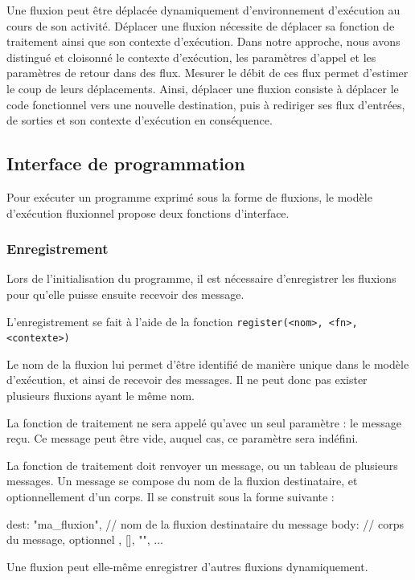 Une fluxion peut être déplacée dynamiquement d'environnement d'exécution au cours de son activité.
Déplacer une fluxion nécessite de déplacer sa fonction de traitement ainsi que son contexte d'exécution.
Dans notre approche, nous avons distingué et cloisonné le contexte d'exécution, les paramètres d'appel et les paramètres de retour dans des flux.
Mesurer le débit de ces flux permet d'estimer le coup de leurs déplacements.
Ainsi, déplacer une fluxion consiste à déplacer le code fonctionnel vers une nouvelle destination, puis à rediriger ses flux d'entrées, de sorties et son contexte d'exécution en conséquence.

\subsection{Interface de programmation}

Pour exécuter un programme exprimé sous la forme de fluxions, le modèle d'exécution fluxionnel propose deux fonctions d'interface.

\subsubsection{Enregistrement}

Lors de l'initialisation du programme, il est nécessaire d'enregistrer les fluxions pour qu'elle puisse ensuite recevoir des message.

L'enregistrement se fait à l'aide de la fonction \texttt{register(<nom>, <fn>, <contexte>)}

Le nom de la fluxion lui permet d'être identifié de manière unique dans le modèle d'exécution, et ainsi de recevoir des messages.
Il ne peut donc pas exister plusieurs fluxions ayant le même nom.

La fonction de traitement ne sera appelé qu'avec un seul paramètre : le message reçu.
Ce message peut être vide, auquel cas, ce paramètre sera indéfini.

La fonction de traitement doit renvoyer un message, ou un tableau de plusieurs messages.
Un message se compose du nom de la fluxion destinataire, et optionnellement d'un corps.
Il se construit sous la forme suivante :

\begin{code}
{
  dest: "ma_fluxion", // nom de la fluxion destinataire du message
  body: // corps du message, optionnel
      {}, [], "", ...
}
\end{code}

Une fluxion peut elle-même enregistrer d'autres fluxions dynamiquement.


